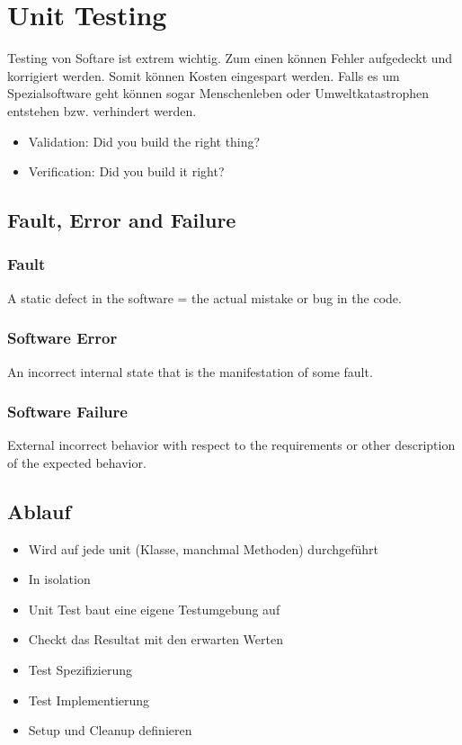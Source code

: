 \documentclass[10pt]{article}
\begin{document}
	

    \section{Unit Testing}
    Testing von Softare ist extrem wichtig. Zum einen k\"onnen Fehler aufgedeckt und korrigiert werden. Somit k\"onnen Kosten eingespart werden. Falls es um Spezialsoftware geht k\"onnen sogar Menschenleben oder Umweltkatastrophen entstehen bzw. verhindert werden.
    \begin{itemize}
        \item Validation: Did you build the right thing?
        \item Verification: Did you build it right?
    \end{itemize}

    \subsection{Fault, Error and Failure}
    \subsubsection{Fault}
    A static defect in the software = the actual mistake or bug in the code.
    \subsubsection{Software Error}
    An incorrect internal state that is the manifestation of some fault.
    \subsubsection{Software Failure}
    External incorrect behavior with respect to the requirements or other description of the expected behavior.
    \subsection{Ablauf}
    \begin{itemize}
        \item Wird auf jede unit (Klasse, manchmal Methoden) durchgef\"uhrt
        \item In isolation
        \item Unit Test baut eine eigene Testumgebung auf
        \item Checkt das Resultat mit den erwarten Werten
        \item Test Spezifizierung
        \item Test Implementierung
        \item Setup und Cleanup definieren
    \end{itemize}
\end{document}
